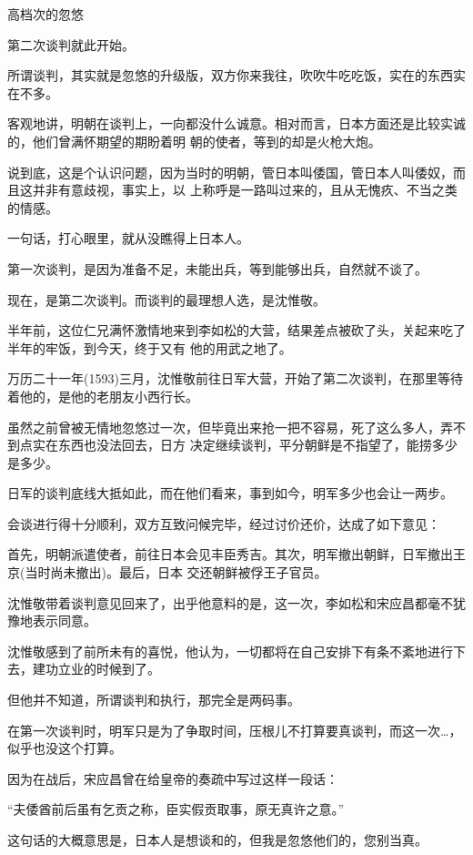 \documentclass[11pt,a4paper,onecolumn]{article}
\begin{document}
高档次的忽悠

第二次谈判就此开始。

所谓谈判，其实就是忽悠的升级版，双方你来我往，吹吹牛吃吃饭，实在的东西实在不多。

客观地讲，明朝在谈判上，一向都没什么诚意。相对而言，日本方面还是比较实诚的，他们曾满怀期望的期盼着明
朝的使者，等到的却是火枪大炮。

说到底，这是个认识问题，因为当时的明朝，管日本叫倭国，管日本人叫倭奴，而且这并非有意歧视，事实上，以
上称呼是一路叫过来的，且从无愧疚、不当之类的情感。

一句话，打心眼里，就从没瞧得上日本人。

第一次谈判，是因为准备不足，未能出兵，等到能够出兵，自然就不谈了。

现在，是第二次谈判。而谈判的最理想人选，是沈惟敬。

半年前，这位仁兄满怀激情地来到李如松的大营，结果差点被砍了头，关起来吃了半年的牢饭，到今天，终于又有
他的用武之地了。

万历二十一年(1593)三月，沈惟敬前往日军大营，开始了第二次谈判，在那里等待着他的，是他的老朋友小西行长。

虽然之前曾被无情地忽悠过一次，但毕竟出来抢一把不容易，死了这么多人，弄不到点实在东西也没法回去，日方
决定继续谈判，平分朝鲜是不指望了，能捞多少是多少。

日军的谈判底线大抵如此，而在他们看来，事到如今，明军多少也会让一两步。

会谈进行得十分顺利，双方互致问候完毕，经过讨价还价，达成了如下意见：

首先，明朝派遣使者，前往日本会见丰臣秀吉。其次，明军撤出朝鲜，日军撤出王京(当时尚未撤出)。最后，日本
交还朝鲜被俘王子官员。

沈惟敬带着谈判意见回来了，出乎他意料的是，这一次，李如松和宋应昌都毫不犹豫地表示同意。

沈惟敬感到了前所未有的喜悦，他认为，一切都将在自己安排下有条不紊地进行下去，建功立业的时候到了。

但他并不知道，所谓谈判和执行，那完全是两码事。

在第一次谈判时，明军只是为了争取时间，压根儿不打算要真谈判，而这一次…，似乎也没这个打算。

因为在战后，宋应昌曾在给皇帝的奏疏中写过这样一段话：

``夫倭酋前后虽有乞贡之称，臣实假贡取事，原无真许之意。''

这句话的大概意思是，日本人是想谈和的，但我是忽悠他们的，您别当真。

\section[\thesection]{}
\end{document}
